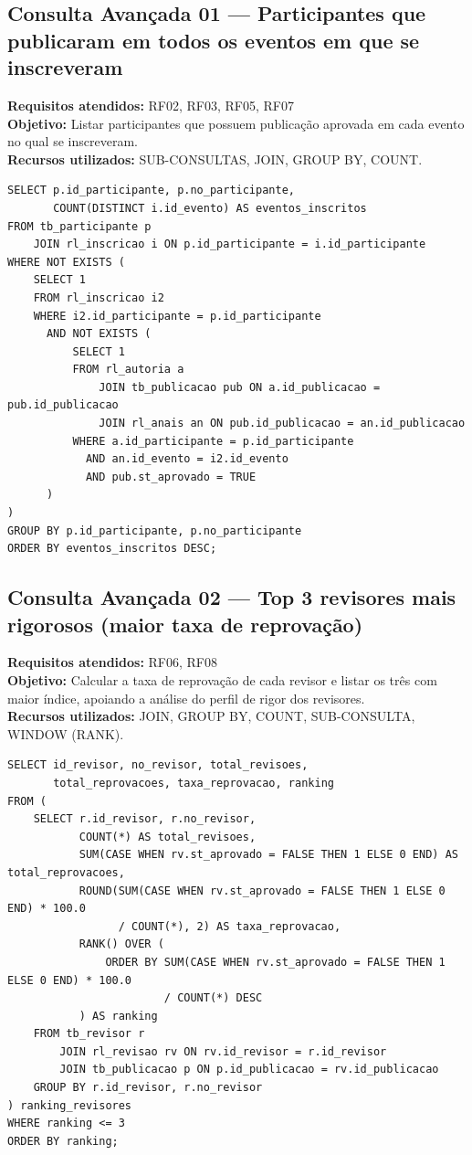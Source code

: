 \documentclass[12pt,a4paper]{article}
\begin{document}
\subsection{Consulta Avançada 01 --- Participantes que publicaram em todos os eventos em que se inscreveram}
\textbf{Requisitos atendidos:} RF02, RF03, RF05, RF07 \\
\textbf{Objetivo:} Listar participantes que possuem publicação aprovada em cada evento no qual se inscreveram. \\
\textbf{Recursos utilizados:} SUB-CONSULTAS, JOIN, GROUP BY, COUNT.
\begin{lstlisting}[caption={QA01 --- Participantes que publicaram em todos os eventos em que se inscreveram.}]
SELECT p.id_participante, p.no_participante,
       COUNT(DISTINCT i.id_evento) AS eventos_inscritos
FROM tb_participante p
    JOIN rl_inscricao i ON p.id_participante = i.id_participante
WHERE NOT EXISTS (
    SELECT 1
    FROM rl_inscricao i2
    WHERE i2.id_participante = p.id_participante
      AND NOT EXISTS (
          SELECT 1
          FROM rl_autoria a
              JOIN tb_publicacao pub ON a.id_publicacao = pub.id_publicacao
              JOIN rl_anais an ON pub.id_publicacao = an.id_publicacao
          WHERE a.id_participante = p.id_participante
            AND an.id_evento = i2.id_evento
            AND pub.st_aprovado = TRUE
      )
)
GROUP BY p.id_participante, p.no_participante
ORDER BY eventos_inscritos DESC;
\end{lstlisting}

\subsection{Consulta Avançada 02 --- Top 3 revisores mais rigorosos (maior taxa de reprovação)}
\textbf{Requisitos atendidos:} RF06, RF08 \\
\textbf{Objetivo:} Calcular a taxa de reprovação de cada revisor e listar os três com maior índice, apoiando a análise do perfil de rigor dos revisores. \\
\textbf{Recursos utilizados:} JOIN, GROUP BY, COUNT, SUB-CONSULTA, WINDOW (RANK).
\begin{lstlisting}[caption={QA02 --- Top 3 revisores mais rigorosos.}]
SELECT id_revisor, no_revisor, total_revisoes,
       total_reprovacoes, taxa_reprovacao, ranking
FROM (
    SELECT r.id_revisor, r.no_revisor,
           COUNT(*) AS total_revisoes,
           SUM(CASE WHEN rv.st_aprovado = FALSE THEN 1 ELSE 0 END) AS total_reprovacoes,
           ROUND(SUM(CASE WHEN rv.st_aprovado = FALSE THEN 1 ELSE 0 END) * 100.0
                 / COUNT(*), 2) AS taxa_reprovacao,
           RANK() OVER (
               ORDER BY SUM(CASE WHEN rv.st_aprovado = FALSE THEN 1 ELSE 0 END) * 100.0
                        / COUNT(*) DESC
           ) AS ranking
    FROM tb_revisor r
        JOIN rl_revisao rv ON rv.id_revisor = r.id_revisor
        JOIN tb_publicacao p ON p.id_publicacao = rv.id_publicacao
    GROUP BY r.id_revisor, r.no_revisor
) ranking_revisores
WHERE ranking <= 3
ORDER BY ranking;
\end{lstlisting}
\end{document}
